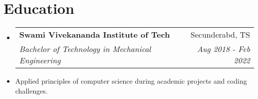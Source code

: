\documentclass[letterpaper,11pt]{article}
\makeatletter
\newcommand{\resumeItem}[1]{
  \item\small{
    {#1 \vspace{-2pt}}
  }
}
\newcommand{\resumeSubheading}[4]{
  \vspace{-2pt}\item
    \begin{tabular*}{0.97\textwidth}[t]{l@{\extracolsep{\fill}}r}
      \textbf{#1} & #2 \\
      \textit{\small#3} & \textit{\small #4} \\
    \end{tabular*}\vspace{-7pt}
}
\newcommand{\resumeSubHeadingListStart}{\begin{itemize}[leftmargin=0.15in, label={}]}
\newcommand{\resumeSubHeadingListEnd}{\end{itemize}}
\newcommand{\resumeItemListStart}{\begin{itemize}}
\newcommand{\resumeItemListEnd}{\end{itemize}\vspace{-5pt}}
\makeatother
\begin{document}
        
%

\section{Education}
  \resumeSubHeadingListStart
    \resumeSubheading
      {Swami Vivekananda Institute of Tech}{Secunderabd, TS}
      {Bachelor of Technology in Mechanical Engineering}{Aug 2018 - Feb 2022}
      \resumeItem{Applied principles of computer science during academic projects and coding challenges.}
  \resumeSubHeadingListEnd




\end{document}
